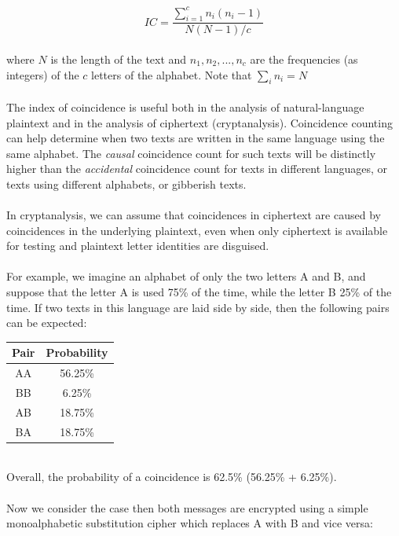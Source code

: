 \documentclass[Lau,binding=0.6cm,oneside]{sapthesis}
\begin{document}
\begin{equation}
IC = \frac{\sum\limits_{i=1}^{c} n_i(n_i-1)}{N(N-1)/c}
\end{equation}
\ \\
where $N$ is the length of the text and $n_1,n_2,...,n_c$ are the frequencies (as integers) of the $c$ letters of the alphabet. Note that $\sum_{i} n_i=N$ \\\\
The index of coincidence is useful both in the analysis of natural-language plaintext and in the analysis of ciphertext (cryptanalysis). Coincidence counting can help determine when two texts are written in the same language using the same alphabet. The \textit{causal} coincidence count for such texts will be distinctly higher than the \textit{accidental} coincidence count for texts in different languages, or texts using different alphabets, or gibberish texts.\\\\
In cryptanalysis, we can assume that coincidences in ciphertext are caused by coincidences in the underlying plaintext, even when only ciphertext is available for testing and plaintext letter identities are disguised.\\\\
For example, we imagine an alphabet of only the two letters \textsf{A} and \textsf{B}, and suppose that the letter \textsf{A} is used 75\% of the time, while the letter \textsf{B} 25\% of the time. If two texts in this language are laid side by side, then the following pairs can be expected:\\

\begin{center}
 \begin{tabular}{||c c||} 
 \hline
 Pair & Probability\\ [0.5ex] 
 \hline\hline
 \textsf{AA} & 56.25\% \\ 
 \hline
 \textsf{BB} & 6.25\% \\
 \hline
 \textsf{AB} & 18.75\% \\
 \hline
 \textsf{BA} & 18.75\% \\
 \hline
\end{tabular}
\end{center}
\ \\
Overall, the probability of a coincidence is 62.5\% (56.25\% + 6.25\%).\\\\
Now we consider the case then both messages are encrypted using a simple monoalphabetic substitution cipher which replaces \textsf{A} with \textsf{B} and vice versa:\\
\end{document}
